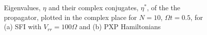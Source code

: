 \begin{figure}
  \centering
  \caption{Eigenvalues, $\eta$ and their complex conjugates, $\eta^*$,
    of the the propagator, plotted in the complex place for $N=10$,
    $\Omega t=0.5$, for (a) SFI with $V_{rr}=100\Omega$ and (b) PXP
    Hamiltonians}
\end{figure}

